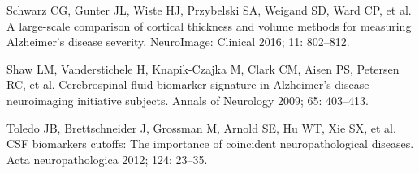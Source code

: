\documentclass[]{article}
\begin{document}
\hypertarget{ref-schwarz_large-scale_2016}{}
Schwarz CG, Gunter JL, Wiste HJ, Przybelski SA, Weigand SD, Ward CP, et
al. A large-scale comparison of cortical thickness and volume methods
for measuring Alzheimer's disease severity. NeuroImage: Clinical 2016;
11: 802--812.

\hypertarget{ref-shaw_cerebrospinal_2009}{}
Shaw LM, Vanderstichele H, Knapik-Czajka M, Clark CM, Aisen PS, Petersen
RC, et al. Cerebrospinal fluid biomarker signature in Alzheimer's
disease neuroimaging initiative subjects. Annals of Neurology 2009; 65:
403--413.

\hypertarget{ref-toledo_csf_2012}{}
Toledo JB, Brettschneider J, Grossman M, Arnold SE, Hu WT, Xie SX, et
al. CSF biomarkers cutoffs: The importance of coincident
neuropathological diseases. Acta neuropathologica 2012; 124: 23--35.
\end{document}
